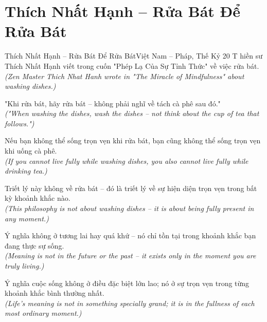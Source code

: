 \section{Thích Nhất Hạnh -- Rửa Bát Để Rửa Bát}
\begin{truyen}{Thích Nhất Hạnh -- Rửa Bát Để Rửa Bát}{Việt Nam -- Pháp, Thế Kỷ 20}
T hiền sư Thích Nhất Hạnh viết trong cuốn "Phép Lạ Của Sự Tỉnh Thức" về việc rửa bát.\\
\textit{(Zen Master Thich Nhat Hanh wrote in "The Miracle of Mindfulness" about washing dishes.)}

"Khi rửa bát, hãy rửa bát -- không phải nghĩ về tách cà phê sau đó."\\
\textit{("When washing the dishes, wash the dishes -- not think about the cup of tea that follows.")}

Nếu bạn không thể sống trọn vẹn khi rửa bát, bạn cũng không thể sống trọn vẹn khi uống cà phê.\\
\textit{(If you cannot live fully while washing dishes, you also cannot live fully while drinking tea.)}

Triết lý này không về rửa bát -- đó là triết lý về sự hiện diện trọn vẹn trong bất kỳ khoảnh khắc nào.\\
\textit{(This philosophy is not about washing dishes -- it is about being fully present in any moment.)}

Ý nghĩa không ở tương lai hay quá khứ -- nó chỉ tồn tại trong khoảnh khắc bạn đang thực sự sống.\\
\textit{(Meaning is not in the future or the past -- it exists only in the moment you are truly living.)}

\end{truyen}
\begin{baihoc}
  Ý nghĩa cuộc sống không ở điều đặc biệt lớn lao; nó ở sự trọn vẹn trong từng khoảnh khắc bình thường nhất.\\
  \textit{(Life's meaning is not in something specially grand; it is in the fullness of each most ordinary moment.)}
\end{baihoc}

